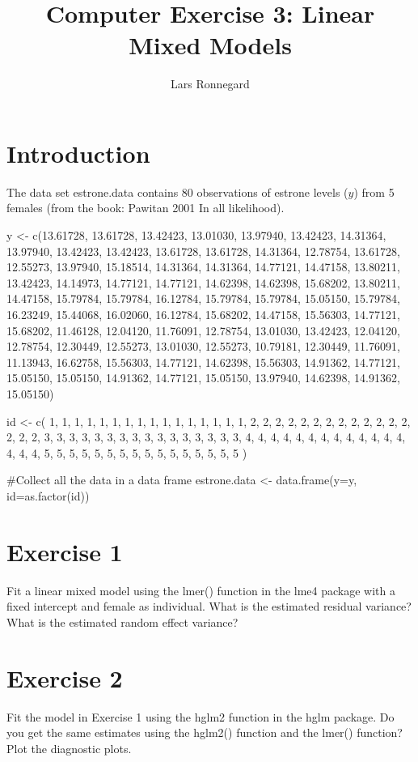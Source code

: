 \documentclass[10pt,a4paper,english]{report}
\begin{document}
\title{Computer Exercise 3: Linear Mixed Models}
\author{Lars Ronnegard}
\maketitle
\section*{Introduction}
The data set estrone.data contains 80 observations of estrone levels ($y$) from 5 females (from the book: Pawitan 2001 In all likelihood).


\begin{Schunk}
\begin{Sinput}
y <- c(13.61728, 13.61728, 13.42423, 13.01030, 13.97940, 13.42423, 14.31364, 
    13.97940, 13.42423, 13.42423, 13.61728, 13.61728, 14.31364, 12.78754, 
    13.61728, 12.55273, 13.97940, 15.18514, 14.31364, 14.31364, 14.77121, 
    14.47158, 13.80211, 13.42423, 14.14973, 14.77121, 14.77121, 14.62398, 
    14.62398, 15.68202, 13.80211, 14.47158, 15.79784, 15.79784, 16.12784, 
    15.79784, 15.79784, 15.05150, 15.79784, 16.23249, 15.44068, 16.02060, 
    16.12784, 15.68202, 14.47158, 15.56303, 14.77121, 15.68202, 11.46128, 
    12.04120, 11.76091, 12.78754, 13.01030, 13.42423, 12.04120, 12.78754, 
    12.30449, 12.55273, 13.01030, 12.55273, 10.79181, 12.30449, 11.76091, 
    11.13943, 16.62758, 15.56303, 14.77121, 14.62398, 15.56303, 14.91362, 
    14.77121, 15.05150, 15.05150, 14.91362, 14.77121, 15.05150, 13.97940, 
    14.62398, 14.91362, 15.05150)

id <- c( 1, 1, 1, 1, 1, 1, 1, 1, 1, 1, 1, 1, 1, 1, 1, 1, 
   2, 2, 2, 2, 2, 2, 2, 2, 2, 2,  2, 2, 2, 2, 2, 2, 
   3, 3, 3, 3, 3, 3, 3, 3, 3, 3, 3, 3, 3, 3, 3, 3, 
   4, 4, 4, 4, 4, 4, 4,  4, 4, 4, 4, 4, 4, 4, 4, 4, 
   5, 5, 5, 5, 5, 5, 5, 5, 5, 5, 5, 5, 5, 5, 5, 5 )

#Collect all the data in a data frame
estrone.data <- data.frame(y=y, id=as.factor(id))
\end{Sinput}
\end{Schunk}

\section*{Exercise 1}
Fit a linear mixed model using the lmer() function in the lme4 package with a fixed intercept and female as individual. What is the estimated residual variance?  What is the estimated random effect variance?

\section*{Exercise 2}
Fit the model in Exercise 1 using the hglm2 function in the hglm package. Do you get the same estimates using the hglm2() function and the lmer() function?
\newline
Plot the diagnostic plots.
\end{document}

